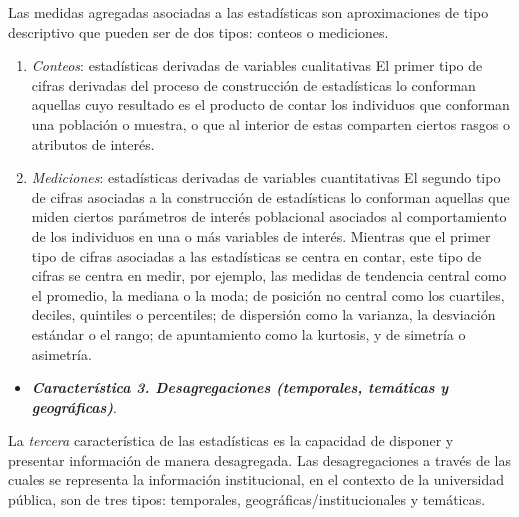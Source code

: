 \documentclass[
]{book}
\providecommand{\tightlist}{%
  \setlength{\itemsep}{0pt}\setlength{\parskip}{0pt}}
\begin{document}
Las medidas agregadas asociadas a las estadísticas son aproximaciones de tipo descriptivo que pueden ser de dos tipos: conteos o mediciones.

\begin{enumerate}
\def\labelenumi{\arabic{enumi}.}
\item
  \emph{Conteos}: estadísticas derivadas de variables cualitativas
  El primer tipo de cifras derivadas del proceso de construcción de estadísticas lo conforman aquellas cuyo resultado es el producto de contar los individuos que conforman una población o muestra, o que al interior de estas comparten ciertos rasgos o atributos de interés.
\item
  \emph{Mediciones}: estadísticas derivadas de variables cuantitativas
  El segundo tipo de cifras asociadas a la construcción de estadísticas lo conforman aquellas que miden ciertos parámetros de interés poblacional asociados al comportamiento de los individuos en una o más variables de interés. Mientras que el primer tipo de cifras asociadas a las estadísticas se centra en contar, este tipo de cifras se centra en medir, por ejemplo, las medidas de tendencia central como el promedio, la mediana o la moda; de posición no central como los cuartiles, deciles, quintiles o percentiles; de dispersión como la varianza, la desviación estándar o el rango; de apuntamiento como la kurtosis, y de simetría o asimetría.
\end{enumerate}

\begin{itemize}
\tightlist
\item
  \textbf{\emph{Característica 3. Desagregaciones (temporales, temáticas y geográficas)}}.
\end{itemize}

La \emph{tercera} característica de las estadísticas es la capacidad de disponer y presentar información de manera desagregada. Las desagregaciones a través de las cuales se representa la información institucional, en el contexto de la universidad pública, son de tres tipos: temporales, geográficas/institucionales y temáticas.
\end{document}
